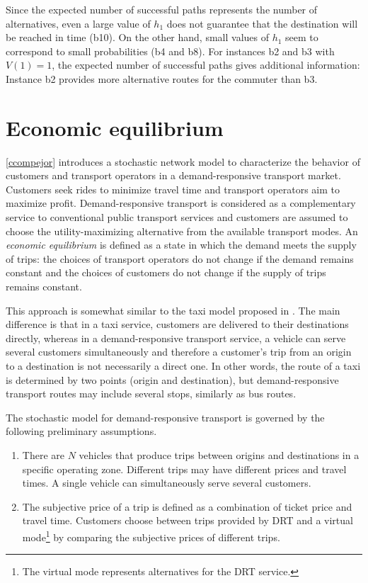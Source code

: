 \documentclass[dissertation,draft*]{aaltoseries}
\begin{document}
Since the expected number of successful paths represents the number of alternatives,
even a large value of $h_1$ does not guarantee that the destination will be reached in time (b10).
On the other hand, small values of $h_1$ seem to correspond to small probabilities (b4 and b8).
For instances b2 and b3 with $V(1)=1$, the expected number of successful paths gives additional
information: Instance b2 provides more alternative routes for the commuter than b3.   



\chapter{Economic equilibrium}
\label{economicmodels}
\ref{ccompejor} introduces a stochastic network model to characterize the 
behavior of customers and transport operators in a demand-responsive transport market. 
Customers seek rides to minimize travel time and transport operators aim to maximize profit. 
Demand-responsive transport is considered as a complementary service to conventional public transport services and 
customers are assumed to choose the utility-maximizing alternative from the available transport modes.
An \emph{economic equilibrium} is defined as a state in which the demand meets the supply of trips: 
the choices of transport operators
do not change if the demand remains constant and the choices of customers
do not change if the supply of trips remains constant. 

This approach is somewhat similar to the taxi model proposed in \cite{yang2010}. The main difference is that in a taxi service, 
customers are delivered to their destinations directly, whereas in a demand-responsive transport service, a vehicle can serve several customers 
simultaneously and therefore a customer's trip from an origin to a destination is not necessarily a direct one. 
In other words, the route of a taxi is determined by two points (origin and destination), but 
demand-responsive transport routes may include several stops, similarly as bus routes. 


The stochastic model for demand-responsive transport is governed by the following preliminary assumptions.
\begin{enumerate}
\item
There are $N$ vehicles that produce trips between 
origins and destinations in a specific operating zone. 
Different trips may have different prices and
travel times. A single vehicle can simultaneously serve several customers.
\item
The subjective price of a trip is defined as a combination of ticket price and travel time.
Customers choose between trips provided by 
DRT and a virtual mode\footnote{The virtual mode represents alternatives for the DRT service.} by comparing the subjective 
prices of different trips.
\end{enumerate} 
\end{document}
